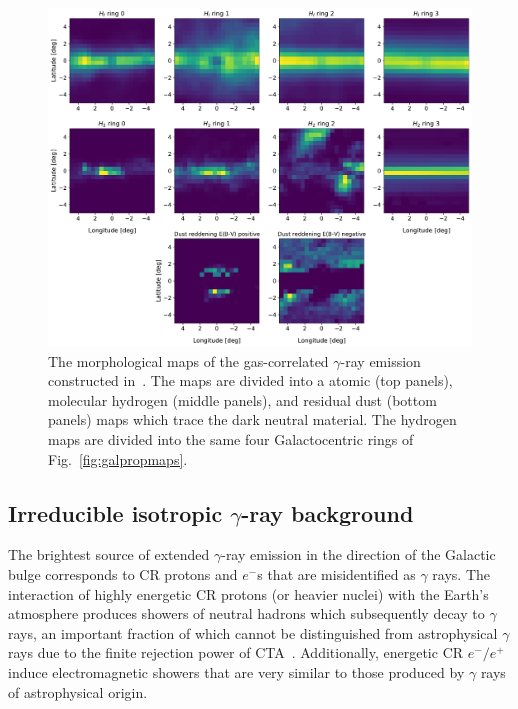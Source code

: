 \documentclass[doublespace,nopageskip]{VTthesis} %
\begin{document}
\begin{figure}
    \begin{center}
    \includegraphics[scale = 0.50]{Figures/CTA/maps_mis.pdf}
    \caption{The morphological maps of the gas-correlated $\gamma$-ray emission constructed in~\citet{Macias:2016nev}. The maps are divided into a atomic (top panels), molecular hydrogen (middle panels), and residual dust (bottom panels) maps which trace the dark neutral material. The hydrogen maps are divided into the same four Galactocentric rings of Fig.~\ref{fig:galpropmaps}.}
    \label{fig:hydro_maps}
    \end{center}
\end{figure}

\subsection{Irreducible isotropic $\gamma$-ray background}
The brightest source of extended $\gamma$-ray emission in the direction of the Galactic bulge corresponds to CR protons and $e^{-}$s that are misidentified as $\gamma$ rays. The interaction of highly energetic CR protons (or heavier nuclei) with the Earth's atmosphere produces showers of neutral hadrons which subsequently decay to $\gamma$ rays, an important fraction of which cannot be distinguished from astrophysical $\gamma$ rays due to the finite rejection power of CTA~\citep{Acharyya:2020sbj,Rinchiuso:2020skh}. Additionally, energetic CR $e^{-}/e^{+}$ induce electromagnetic showers that are very similar to those produced by $\gamma$ rays of astrophysical origin. 
\end{document}
